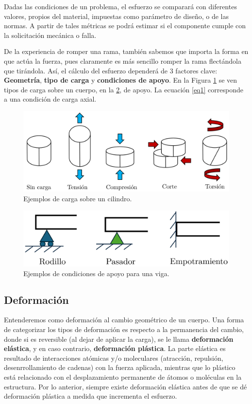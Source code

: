 Dadas las condiciones de un problema, el esfuerzo se comparará con diferentes valores, propios del material, impuestas como parámetro de diseño, o de las normas. A partir de tales métricas se podrá estimar si el componente cumple con la solicitación mecánica o falla.

De la experiencia de romper una rama, también sabemos que importa la forma en que actúa la fuerza, pues claramente es más sencillo romper la rama flectándola que tirándola. Así, el cálculo del esfuerzo dependerá de 3 factores clave: \textbf{Geometría}, \textbf{tipo de carga} y \textbf{condiciones de apoyo}. En la Figura \ref{fig:1} se ven tipos de carga sobre un cuerpo, en la \ref{fig:2}, de apoyo. La ecuación \ref{eq1} corresponde a una condición de carga axial. 

\begin{figure}[h!]
    \centering
    \includegraphics[width=0.9\linewidth]{imgs/cargas.png}
    \caption{Ejemplos de carga sobre un cilindro.}
    \label{fig:1}
\end{figure}

\begin{figure}[h!]
	\centering
	\includegraphics[width=0.7\linewidth]{imgs/apoios.png}
	\caption{Ejemplos de condiciones de apoyo para una viga.}
	\label{fig:2}
\end{figure}

\subsection{Deformación}

Entenderemos como deformación al cambio geométrico de un cuerpo. Una forma de categorizar los tipos de deformación es respecto a la permanencia del cambio, donde si es reversible (al dejar de aplicar la carga), se le llama \textbf{deformación elástica}, y en caso contrario, \textbf{deformación plástica}. La parte elástica es resultado de interacciones atómicas y/o moleculares (atracción, repulsión, desenrrollamiento de cadenas) con la fuerza aplicada, mientras que lo plástico está relacionado con el desplazamiento permanente de átomos o moléculas en la estructura. Por lo anterior, siempre existe deformación elástica antes de que se dé deformación plástica a medida que incrementa el esfuerzo.

